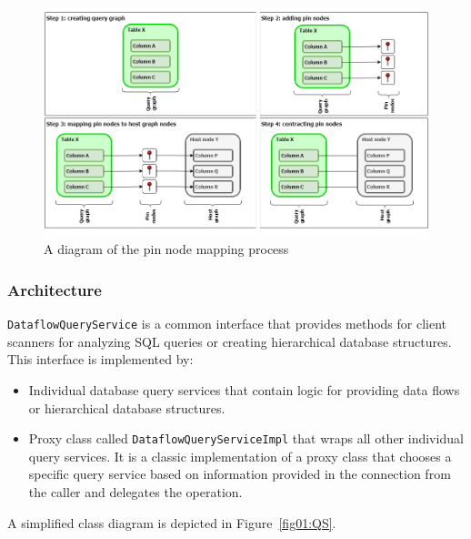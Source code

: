\begin{figure}[ht]\centering
\includegraphics[width=1.0\textwidth]{img/pin_nodes.png}
\caption{A diagram of the pin node mapping process}
\label{fig:pinNodes}
\end{figure}  

\subsubsection{Architecture}

\texttt{DataflowQueryService} is a common interface that provides methods for client scanners for analyzing SQL queries or creating hierarchical database structures. This interface is implemented by:
\begin{itemize}
    \item Individual database query services that contain logic for providing data flows or hierarchical database structures.
    \item Proxy class called \texttt{DataflowQueryServiceImpl} that wraps all other individual query services. It is a classic implementation of a proxy class that chooses a specific query service based on information provided in the connection from the caller and delegates the operation.    
\end{itemize}

A simplified class diagram is depicted in Figure~\ref{fig01:QS}.

